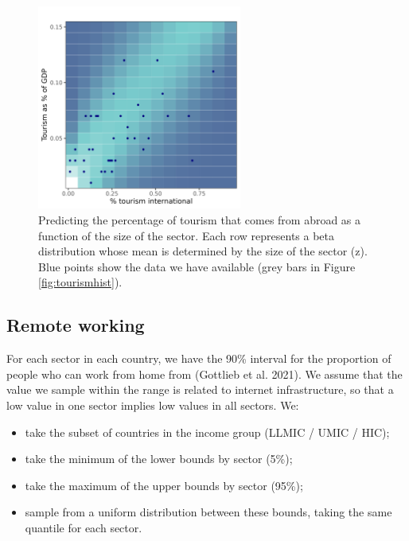 \documentclass[
]{article}
\makeatletter
\providecommand{\tightlist}{%
  \setlength{\itemsep}{0pt}\setlength{\parskip}{0pt}}
\newcounter{figno}
\newenvironment{fignos:no-prefix-figure-caption}{
  \caption@ifcompatibility{}{
    \let\oldthefigure\thefigure
    \let\oldtheHfigure\theHfigure
    \renewcommand{\thefigure}{figno:\thefigno}
    \renewcommand{\theHfigure}{figno:\thefigno}
    \stepcounter{figno}
    \captionsetup{labelformat=empty}
  }
}{
  \caption@ifcompatibility{}{
    \captionsetup{labelformat=default}
    \let\thefigure\oldthefigure
    \let\theHfigure\oldtheHfigure
    \addtocounter{figure}{-1}
  }
}
\makeatother
\begin{document}
\begin{fignos:no-prefix-figure-caption}

\begin{figure}
\centering
\includegraphics[width=0.6\textwidth,height=\textheight]{figures/sectortourism.png}
\caption{\label{fig:sectortourism} Predicting the percentage of tourism that comes from abroad as a function of the size of the sector. Each row represents a beta distribution whose mean is determined by the size of the sector (z). Blue points show the data we have available (grey bars in Figure \ref{fig:tourismhist}).}
\end{figure}

\end{fignos:no-prefix-figure-caption}

\newpage

\hypertarget{remote-working}{%
\subsection{Remote working}\label{remote-working}}

For each sector in each country, we have the 90\% interval for the proportion of people who can work from home from (Gottlieb et al. 2021). We assume that the value we sample within the range is related to internet infrastructure, so that a low value in one sector implies low values in all sectors. We:

\begin{itemize}
\tightlist
\item
  take the subset of countries in the income group (LLMIC / UMIC / HIC);
\item
  take the minimum of the lower bounds by sector (5\%);
\item
  take the maximum of the upper bounds by sector (95\%);
\item
  sample from a uniform distribution between these bounds, taking the same quantile for each sector.
\end{itemize}
\end{document}
